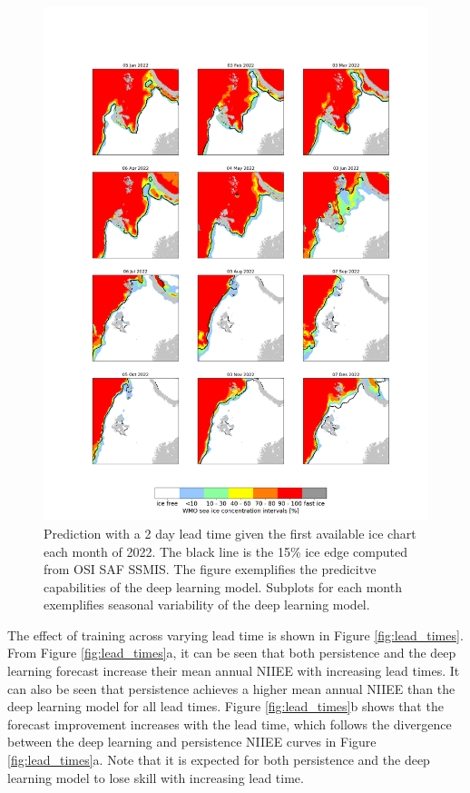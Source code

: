 \documentclass[../main/thesis]{subfiles}
\begin{document}
\begin{figure}
    \centering
    \includegraphics[width=.855\textwidth]{Forecast_time_series}
    \caption{\label{fig:timeseries}Prediction with a 2 day lead time given the first available ice chart each month of 2022. The black line is the 15\% ice edge computed from OSI SAF SSMIS. The figure exemplifies the predicitve capabilities of the deep learning model. Subplots for each month exemplifies seasonal variability of the deep learning model.}
\end{figure}

The effect of training across varying lead time is shown in Figure \ref{fig:lead_times}. From Figure \ref{fig:lead_times}a, it can be seen that both persistence and the deep learning forecast increase their mean annual NIIEE with increasing lead times. It can also be seen that persistence achieves a higher mean annual NIIEE than the deep learning model for all lead times. Figure \ref{fig:lead_times}b shows that the forecast improvement increases with the lead time, which follows the divergence between the deep learning and persistence NIIEE curves in Figure \ref{fig:lead_times}a. Note that it is expected for both persistence and the deep learning model to lose skill with increasing lead time.
\end{document}

